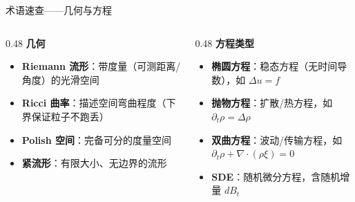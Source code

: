 \documentclass[aspectratio=169,10pt]{beamer}
\begin{document}
\begin{frame}{术语速查——几何与方程}
  \begin{columns}[T]
    \begin{column}{0.48\textwidth}
      \textbf{几何}
      \begin{itemize}\small
        \item \textbf{Riemann 流形}：带度量（可测距离/角度）的光滑空间
        \item \textbf{Ricci 曲率}：描述空间弯曲程度（下界保证粒子不跑丢）
        \item \textbf{Polish 空间}：完备可分的度量空间
        \item \textbf{紧流形}：有限大小、无边界的流形
      \end{itemize}
    \end{column}
    \begin{column}{0.48\textwidth}
      \textbf{方程类型}
      \begin{itemize}\small
        \item \textbf{椭圆方程}：稳态方程（无时间导数），如 $\Delta u = f$
        \item \textbf{抛物方程}：扩散/热方程，如 $\partial_t\rho=\Delta\rho$
        \item \textbf{双曲方程}：波动/传输方程，如 $\partial_t\rho+\nabla\cdot(\rho\xi)=0$
        \item \textbf{SDE}：随机微分方程，含随机增量 $dB_t$
      \end{itemize}
    \end{column}
  \end{columns}
\end{frame}
\end{document}
